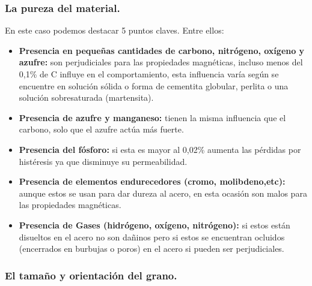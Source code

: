 \documentclass[12pt,a4paper]{article}
\begin{document}
\subsubsection{La pureza del material.}

En este caso podemos destacar 5 puntos claves. Entre ellos:

\begin{itemize}
    \item \textbf{Presencia en pequeñas cantidades de carbono, nitrógeno, oxígeno y azufre:} son perjudiciales para las propiedades magnéticas, incluso menos del 0,1\% de C influye en el comportamiento, esta influencia varía según se encuentre en solución sólida o forma de cementita globular, perlita o una solución sobresaturada (martensita).
    \item \textbf{Presencia de azufre y manganeso:}  tienen la misma influencia que el carbono, solo que el azufre actúa más fuerte.
    \item \textbf{Presencia del fósforo:} si esta es mayor al 0,02\% aumenta las pérdidas por histéresis ya que disminuye su permeabilidad.
    \item \textbf{Presencia de elementos endurecedores (cromo, molibdeno,etc):} aunque estos se usan para dar dureza al acero, en esta ocasión son malos para las propiedades magnéticas.
    \item \textbf{Presencia de Gases (hidrógeno, oxígeno, nitrógeno):} si estos están disueltos en el acero no son dañinos pero si estos se encuentran ocluidos (encerrados en burbujas o poros) en el acero si pueden ser perjudiciales.
\end{itemize}

\subsubsection{El tamaño y orientación del grano.}
\end{document}
